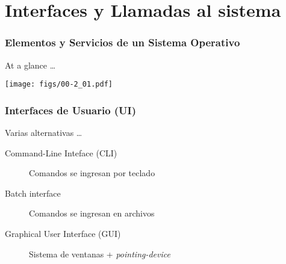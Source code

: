 \documentclass[letter]{beamer}
\begin{document}
\section{Interfaces y Llamadas al sistema}

\begin{frame}
  \frametitle{Elementos y Servicios de un Sistema Operativo}

  At a glance \ldots
  
  \begin{center}
    \texttt{[image: figs/00-2\_01.pdf]}
  \end{center}

\end{frame}

\begin{frame}
  \frametitle{Interfaces de Usuario (UI)}

  Varias alternativas \ldots
  \begin{description}
    \item[Command-Line Inteface (CLI)] Comandos se ingresan por teclado
    \item[Batch interface] Comandos se ingresan en archivos
    \item[Graphical User Interface (GUI)] Sistema de ventanas + {\em pointing-device}
  \end{description}
  

\end{frame}
\end{document}
